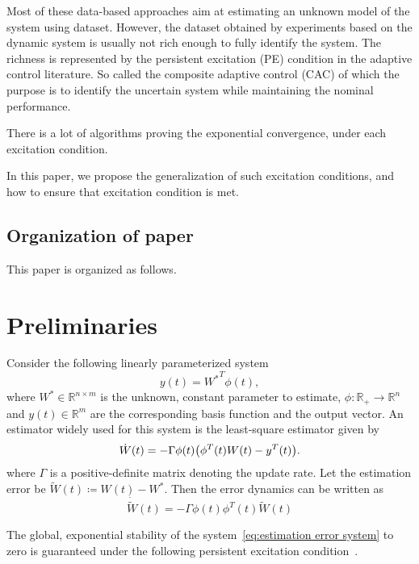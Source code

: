 \documentclass[]{IEEEtran}
\theoremstyle{definition}
\theoremstyle{remark}
\newcommand{\MB}[1]{\mathbb{#1}}
\begin{document}
Most of these data-based approaches aim at estimating an unknown model of the
system using dataset. However, the dataset obtained by experiments based on the
dynamic system is usually not rich enough to fully identify the system. The
richness is represented by the persistent excitation (PE) condition in the
adaptive control literature. So called the composite adaptive control (CAC)
of which the purpose is to identify the uncertain system while maintaining the
nominal performance.

There is a lot of algorithms proving the exponential convergence, under each
excitation condition.

In this paper, we propose the generalization of such excitation conditions, and
how to ensure that excitation condition is met.

\subsection{Organization of paper}

This paper is organized as follows.


\section{Preliminaries}

Consider the following linearly parameterized system
\begin{equation*}
	y(t) = {W^\ast}^T \phi(t),
\end{equation*}
where $W^\ast \in \MB{R}^{n \times m}$ is the unknown, constant parameter to
estimate, $\phi: \MB{R}_{+} \to \MB{R}^n$ and $y(t) \in \MB{R}^m$ are the
corresponding basis function and the output vector. An estimator widely used
for this system is the least-square estimator given by
\begin{equation}\label{eq:estimation system}
	\dot{W}(t) =  - \Gamma \phi(t) \qty(\phi^T(t) W(t) - y^T(t)).
\end{equation}
where $\Gamma$ is a positive-definite matrix denoting the update rate. Let the
estimation error be $\tilde{W}(t) \coloneqq W(t) - W^\ast$. Then the error
dynamics can be written as
\begin{equation}\label{eq:estimation error system}
	\dot{\tilde{W}} (t) = - \Gamma \phi(t) \phi^T(t) \tilde{W}(t)
\end{equation}

The global, exponential stability of the
system~\eqref{eq:estimation error system} to zero is guaranteed under the
following persistent excitation condition~\cite{anderson_exponential_1977,
slotine_applied_1991}.
\end{document}
